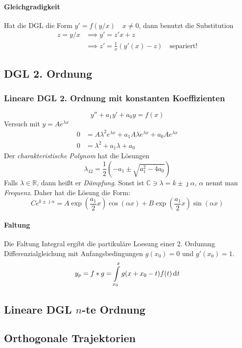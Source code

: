 \documentclass[margin=small, twocolumn]{hsrzf}
\numberwithin{equation}{subsection}
\begin{document}
\paragraph{Gleichgradigkeit} Hat die DGL die Form \(y' = f(y/x) \quad x \neq 0\), dann benutzt die Substitution
\begin{align*}
    z = y/x &\implies y' = z'x + z \\
    &\implies z' = \frac{1}{x}\left(y'(x) - z\right) \quad\text{separiert!}
\end{align*}


\subsection{DGL 2. Ordnung}

\subsubsection{Lineare DGL 2. Ordnung mit konstanten Koeffizienten}
\[
    y'' + a_1 y' + a_0 y = f(x)
\]
Versuch mit \(y = Ae^{\lambda x}\)
\begin{align*}
    0 &= A\lambda^2 e^{\lambda x} + a_1 A \lambda e^{\lambda x} + a_0 A e^{\lambda x} \\
    0 &= \lambda^2 + a_1\lambda + a_0
\end{align*}
Der \emph{charakteristische Polynom} hat die L\"osungen
\[
    \lambda_{12} = \frac{1}{2}\left(-a_1 \pm \sqrt{a_1^2 - 4a_0}\right)
\]
Falls \(\lambda \in \mathbb{R}\), dann hei{\ss}t er \emph{D\"ampfung}. Sonst ist \(\mathbb{C} \ni \lambda = k \pm\jmath\alpha\), \(\alpha\) nennt man \emph{Frequenz}. Daher hat die L\"osung die Form:
\[
    Ce^{k\pm\jmath\alpha} 
    = A\exp\left(\frac{a_1}{2}x\right)\cos(\alpha x)
    + B\exp\left(\frac{a_1}{2}x\right)\sin(\alpha x)
\]

\paragraph{Faltung}
Die Faltung Integral ergibt die partikul\"are Loesung einer 2. Ordunung Differenzialgleichung mit Anfangsbedingungen \(g(x_0) = 0\) und \(g'(x_0) = 1\).
\[
    y_p = f * g = \int\limits_{x_0}^x g(x + x_0 - t) f(t) \,\mathrm{d}^{} t
\]

\subsection{Lineare DGL \(n\)-te Ordnung}

\subsection{Orthogonale Trajektorien}
\end{document}
